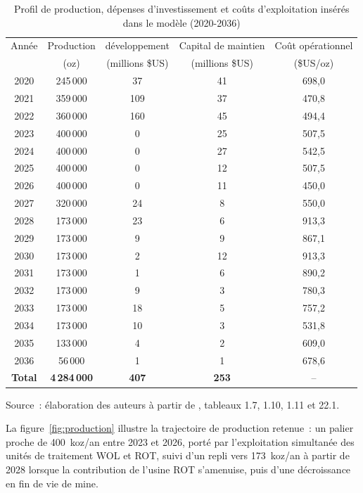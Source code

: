\begin{table}[H]
\centering
\caption{Profil de production, dépenses d'investissement et coûts d'exploitation insérés dans le modèle (2020-2036)}
\label{tab:profil-production}
\small
\begin{tabular}{ccccc}
\toprule
Année & Production & \CAPEX{} développement & Capital de maintien & Coût opérationnel \\
      & (oz)       & (millions \$US)        & (millions \$US)     & (\$US/oz) \\
\midrule
2020 & 245\,000 & 37  & 41 & 698,0 \\
2021 & 359\,000 & 109 & 37 & 470,8 \\
2022 & 360\,000 & 160 & 45 & 494,4 \\
2023 & 400\,000 & 0   & 25 & 507,5 \\
2024 & 400\,000 & 0   & 27 & 542,5 \\
2025 & 400\,000 & 0   & 12 & 507,5 \\
2026 & 400\,000 & 0   & 11 & 450,0 \\
2027 & 320\,000 & 24  & 8  & 550,0 \\
2028 & 173\,000 & 23  & 6  & 913,3 \\
2029 & 173\,000 & 9   & 9  & 867,1 \\
2030 & 173\,000 & 2   & 12 & 913,3 \\
2031 & 173\,000 & 1   & 6  & 890,2 \\
2032 & 173\,000 & 9   & 3  & 780,3 \\
2033 & 173\,000 & 18  & 5  & 757,2 \\
2034 & 173\,000 & 10  & 3  & 531,8 \\
2035 & 133\,000 & 4   & 2  & 609,0 \\
2036 & 56\,000  & 1   & 1  & 678,6 \\
\midrule
\textbf{Total} & \textbf{4\,284\,000} & \textbf{407} & \textbf{253} & -- \\
\bottomrule
\end{tabular}

\vspace{0.2cm}
\footnotesize Source~: élaboration des auteurs à partir de \citet{lycopodium2020pfs}, tableaux 1.7, 1.10, 1.11 et 22.1.
\end{table}

La figure~\ref{fig:production} illustre la trajectoire de production retenue~: un palier proche de 400~koz/an entre 2023 et 2026, porté par l'exploitation simultanée des unités de traitement WOL et ROT, suivi d'un repli vers 173~koz/an à partir de 2028 lorsque la contribution de l'usine ROT s'amenuise, puis d'une décroissance en fin de vie de mine.

